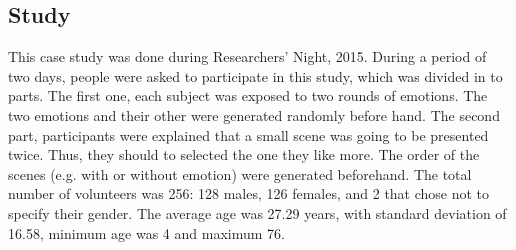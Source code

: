 \subsection{Study}

This case study was done during Researchers' Night, 2015. During a period of two days, people were asked to participate in this study, which was divided in to parts. The first one, each subject was exposed to two rounds of emotions. The two emotions and their other were generated randomly before hand. The second part, participants were explained that a small scene was going to be presented twice. Thus, they should to selected the one they like more. The order of the scenes (e.g. with or without emotion) were generated beforehand. The total number of volunteers was 256: 128 males, 126 females, and 2 that chose not to specify their gender. The average age was 27.29 years, with standard deviation of 16.58, minimum age was 4 and maximum 76.
